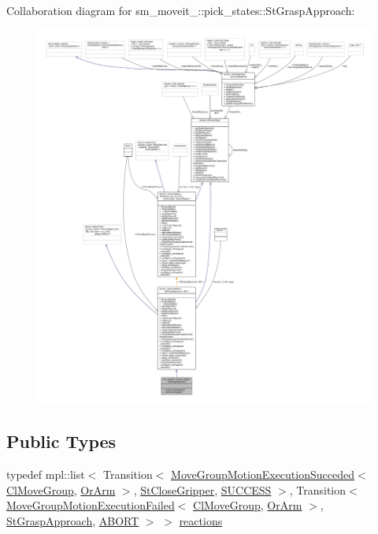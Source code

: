 Collaboration diagram for sm\+\_\+moveit\+\_\+:\+:pick\+\_\+states\+:\+:St\+Grasp\+Approach\+:
\nopagebreak
\begin{figure}[H]
\begin{center}
\leavevmode
\includegraphics[width=350pt]{structsm__moveit__3_1_1pick__states_1_1StGraspApproach__coll__graph}
\end{center}
\end{figure}
\subsection*{Public Types}
\begin{DoxyCompactItemize}
\item 
typedef mpl\+::list$<$ Transition$<$ \hyperlink{structmove__group__interface__client_1_1MoveGroupMotionExecutionSucceded}{Move\+Group\+Motion\+Execution\+Succeded}$<$ \hyperlink{classmove__group__interface__client_1_1ClMoveGroup}{Cl\+Move\+Group}, \hyperlink{classsm__moveit__3_1_1OrArm}{Or\+Arm} $>$, \hyperlink{structsm__moveit__3_1_1pick__states_1_1StCloseGripper}{St\+Close\+Gripper}, \hyperlink{classSUCCESS}{S\+U\+C\+C\+E\+SS} $>$, Transition$<$ \hyperlink{structmove__group__interface__client_1_1MoveGroupMotionExecutionFailed}{Move\+Group\+Motion\+Execution\+Failed}$<$ \hyperlink{classmove__group__interface__client_1_1ClMoveGroup}{Cl\+Move\+Group}, \hyperlink{classsm__moveit__3_1_1OrArm}{Or\+Arm} $>$, \hyperlink{structsm__moveit__3_1_1pick__states_1_1StGraspApproach}{St\+Grasp\+Approach}, \hyperlink{classABORT}{A\+B\+O\+RT} $>$ $>$ \hyperlink{structsm__moveit__3_1_1pick__states_1_1StGraspApproach_a26e2854caafae5beb654ea0013301526}{reactions}
\end{DoxyCompactItemize}
